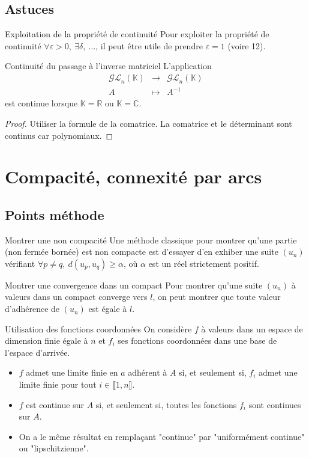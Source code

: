 \documentclass[french]{book}
\newcommand{\R}{\mathbb{R}}
\newcommand{\C}{\mathbb{C}}
\newcommand{\K}{\mathbb{K}}
\newcommand{\inv}{^{-1}}
\theoremstyle{plain}
\theoremstyle{definition}
\theoremstyle{remark}
\begin{document}
\section{Astuces}
\begin{AS}{Exploitation de la propriété de continuité} Pour exploiter la propriété de continuité $\forall\varepsilon>0,\ \exists\delta,\ \ldots$, il peut être utile de prendre $\varepsilon=1$ (voire 12).
\end{AS}
\begin{AS}{Continuité du passage à l'inverse matriciel} L'application $$\begin{array}{rcl}
	\mathcal{GL}_n(\K)&\longrightarrow&\mathcal{GL}_n(\K) \\
	A&\longmapsto&A\inv
\end{array}$$ est continue lorsque $\K=\R$ ou $\K=\C$.
\end{AS}
\begin{proof}
	Utiliser la formule de la comatrice. La comatrice et le déterminant sont continus car polynomiaux.
\end{proof}


\chapter{Compacité, connexité par arcs}
\localtableofcontents
\section{Points méthode}
\begin{PM}{Montrer une non compacité} Une méthode classique pour montrer qu'une partie (non fermée bornée) est non compacte est d'essayer d'en exhiber une suite $(u_n)$ vérifiant $\forall p\ne q,\ d(u_p,u_q)\geqslant\alpha$, où $\alpha$ est un réel strictement positif.
\end{PM}
\begin{PM}{Montrer une convergence dans un compact} Pour montrer qu'une suite $(u_n)$ à valeurs dans un compact converge vers $l$, on peut montrer que toute valeur d'adhérence de $(u_n)$ est égale à $l$.
\end{PM}
\begin{PM}{Utilisation des fonctions coordonnées} On considère $f$ à valeurs dans un espace de dimension finie égale à $n$ et $f_i$ ses fonctions coordonnées dans une base de l'espace d'arrivée.
\begin{itemize}
	\item $f$ admet une limite finie en $a$ adhérent à $A$ si, et seulement si, $f_i$ admet une limite finie pour tout $i\in\llbracket1,n\rrbracket$.
	\item $f$ est continue sur $A$ si, et seulement si, toutes les fonctions $f_i$ sont continues sur $A$.
	\item On a le même résultat en remplaçant "continue" par "uniformément continue" ou "lipschitzienne".
\end{itemize}
\end{PM}
\end{document}
